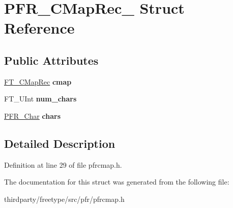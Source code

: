 \hypertarget{struct_p_f_r___c_map_rec__}{}\section{P\+F\+R\+\_\+\+C\+Map\+Rec\+\_\+ Struct Reference}
\label{struct_p_f_r___c_map_rec__}
\subsection*{Public Attributes}
\begin{DoxyCompactItemize}
\item 
\mbox{\label{struct_p_f_r___c_map_rec___aac7d23032dde3bddb90fd6c9fce72503}} 
\hyperlink{struct_f_t___c_map_rec__}{F\+T\+\_\+\+C\+Map\+Rec} {\bfseries cmap}
\item 
\mbox{\label{struct_p_f_r___c_map_rec___a6999763c66978fd0598cdd7b4c139b74}} 
F\+T\+\_\+\+U\+Int {\bfseries num\+\_\+chars}
\item 
\mbox{\label{struct_p_f_r___c_map_rec___ac323c13a0618f168e2604ea8a9529803}} 
\hyperlink{struct_p_f_r___char_rec__}{P\+F\+R\+\_\+\+Char} {\bfseries chars}
\end{DoxyCompactItemize}


\subsection{Detailed Description}


Definition at line 29 of file pfrcmap.\+h.



The documentation for this struct was generated from the following file\+:\begin{DoxyCompactItemize}
\item 
thirdparty/freetype/src/pfr/pfrcmap.\+h\end{DoxyCompactItemize}
